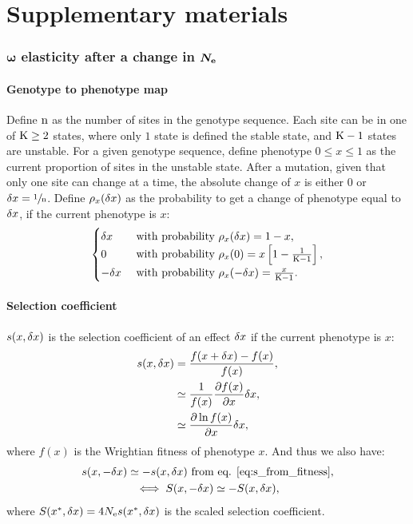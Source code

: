 \documentclass{article}
\begin{document}
\part*{Supplementary materials}
\tableofcontents
\section{$\bm{\omega}$ elasticity after a change in $\bm{N_{\mathrm{e}}}$}
\subsection{Genotype to phenotype map}
Define $\text{n}$ as the number of sites in the genotype sequence.
Each site can be in one of $\text{K} \geq 2$ states, where only $1$ state is defined the stable state, and $\text{K} - 1$ states are unstable.
For a given genotype sequence, define phenotype $0 \leq x \leq 1$ as the current proportion of sites in the unstable state.
After a mutation, given that only one site can change at a time, the absolute change of $x$ is either $0$ or $\delta x=\sfrac{1}{\text{n}}$.
Define $\rho_{x}(\delta x)$ as the probability to get a change of phenotype equal to $\delta x$, if the current phenotype is $x$:\\
\begin{gather}
\begin{cases}
\delta x &\text{ with probability } \rho_{x}(\delta x) = 1-x, \\
0 &\text{ with probability } \rho_{x}(0) = x \left[1 - \frac{1}{\text{K} - 1}\right], \\
-\delta x &\text{ with probability } \rho_{x}(-\delta x) = \frac{x}{\text{K} - 1}.\\
\end{cases} \label{eq:proba}
\end{gather}
\subsection{Selection coefficient}
$s(x, \delta x)$ is the selection coefficient of an effect $\delta x$ if the current phenotype is $x$:
\begin{align}
s(x, \delta x) &= \frac{f(x + \delta x) - f(x)}{f( x)}, \\
 &\simeq \frac{1}{f(x)}\frac{ \partial f(x) }{\partial x} \delta x, \\
 &\simeq \frac{ \partial \ln f(x) }{\partial x} \delta x, \label{eq:s_from_fitness}
\end{align}
where $f( x)$ is the Wrightian fitness of phenotype $x$. And thus we also have:
\begin{gather}
s(x, -\delta x) \simeq - s(x, \delta x) \text{ from eq. \ref{eq:s_from_fitness}} \label{eq:s_minus_deltax}, \\
\iff S(x, -\delta x) \simeq - S(x, \delta x), \label{eq:S_minus_deltax}
\end{gather}
where $S(x^{*}, \delta x) = 4N_{\mathrm{e}} s (x^{*}, \delta x)$ is the scaled selection coefficient.
\end{document}
